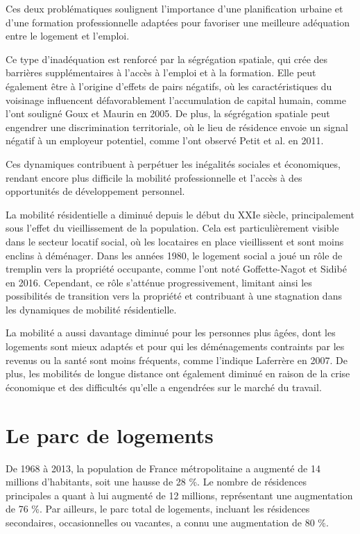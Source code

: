\documentclass[a4paper, 12pt]{report}
\begin{document}
Ces deux problématiques soulignent l'importance d'une planification urbaine et d'une formation professionnelle adaptées pour favoriser une meilleure adéquation entre le logement et l'emploi.

Ce type d’inadéquation est renforcé par la ségrégation spatiale, qui crée des barrières supplémentaires à l'accès à l'emploi et à la formation. Elle peut également être à l’origine d’effets de pairs négatifs, où les caractéristiques du voisinage influencent défavorablement l'accumulation de capital humain, comme l'ont souligné Goux et Maurin en 2005. De plus, la ségrégation spatiale peut engendrer une discrimination territoriale, où le lieu de résidence envoie un signal négatif à un employeur potentiel, comme l'ont observé Petit et al. en 2011.

Ces dynamiques contribuent à perpétuer les inégalités sociales et économiques, rendant encore plus difficile la mobilité professionnelle et l'accès à des opportunités de développement personnel.

La mobilité résidentielle a diminué depuis le début du XXIe siècle, principalement sous l’effet du vieillissement de la population. Cela est particulièrement visible dans le secteur locatif social, où les locataires en place vieillissent et sont moins enclins à déménager. Dans les années 1980, le logement social a joué un rôle de tremplin vers la propriété occupante, comme l'ont noté Goffette-Nagot et Sidibé en 2016. Cependant, ce rôle s’atténue progressivement, limitant ainsi les possibilités de transition vers la propriété et contribuant à une stagnation dans les dynamiques de mobilité résidentielle.

La mobilité a aussi davantage diminué pour les personnes plus âgées, dont les logements sont mieux adaptés et pour qui les déménagements contraints par les revenus ou la santé sont moins fréquents, comme l'indique Laferrère en 2007. De plus, les mobilités de longue distance ont également diminué en raison de la crise économique et des difficultés qu’elle a engendrées sur le marché du travail.

\section{Le parc de logements}

De 1968 à 2013, la population de France métropolitaine a augmenté de 14 millions d’habitants, soit une hausse de 28 \%. Le nombre de résidences principales a quant à lui augmenté de 12 millions, représentant une augmentation de 76 \%. Par ailleurs, le parc total de logements, incluant les résidences secondaires, occasionnelles ou vacantes, a connu une augmentation de 80 \%.
\end{document}
